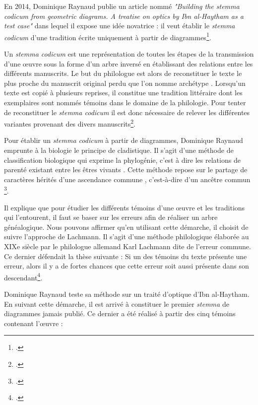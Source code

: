 En 2014, Dominique Raynaud publie un article nommé \textit{"Building the stemma codicum from geometric diagrams. A treatise on optics by Ibn al-Haytham as a test case"} dans lequel il expose une idée novatrice : il veut établir le \textit{stemma codicum} d'une tradition écrite uniquement à partir de diagrammes\footcite{raynaudBuildingStemmaCodicum2014}.

Un \textit{stemma codicum} est une représentation de toutes les étapes de la transmission d'une œuvre sous la forme d'un arbre inversé en établissant des relations entre les différents manuscrits. Le but du philologue est alors de reconstituer le texte le plus proche du manuscrit original perdu que l'on nomme \og archétype \fg. Lorsqu'un texte est copié à plusieurs reprises, il constitue une \og tradition littéraire \fg dont les exemplaires sont nommés \og témoins \fg dans le domaine de la philologie. Pour tenter de reconstituer le \textit{stemma codicum} il est donc nécessaire de relever les différentes variantes provenant des divers manuscrits\footcite{pouliquenUsingLatticesReconstructing}.

Pour établir un \textit{stemma codicum} à partir de diagrammes, Dominique Raynaud emprunte à la biologie le principe de cladistique. Il s'agit \og d'une méthode de classification biologique qui exprime la phylogénie, c'est à dire les relations de parenté existant entre les êtres vivants \fg. Cette méthode \og repose sur le partage de caractères hérités d'une ascendance commune \fg, c'est-à-dire d'un \og ancêtre commun \fg \footcite{tassyCLADISTIQUE2012}.

Il explique que pour étudier les différents témoins d'une œuvre et les traditions qui l'entourent, il faut se baser sur les erreurs afin de réaliser un arbre généalogique. Nous pouvons affirmer qu'en utilisant cette démarche, il choisit de suivre l'approche de Lachmann. Il s'agit d'une méthode philologique élaborée au XIXe siècle par le philologue allemand Karl Lachmann dite de l'erreur commune. Ce dernier défendait la thèse suivante : Si un des témoins du texte présente une erreur, alors il y a de fortes chances que cette erreur soit aussi présente dans son descendant\footcite{pouliquenUsingLatticesReconstructing}.

Dominique Raynaud teste sa méthode sur un traité d'optique d'Ibn al-Haytham. En suivant cette démarche, il est arrivé à constituer le premier \textit{stemma} de diagrammes jamais publié. Ce dernier a été réalisé à partir des cinq témoins contenant l'œuvre : 


